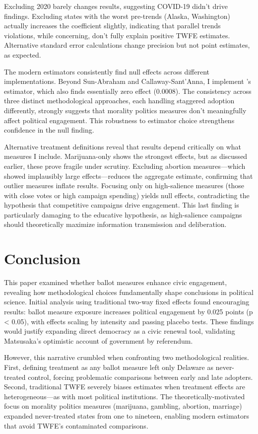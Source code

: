 \documentclass[12pt,letterpaper,oneside]{book}
\begin{document}
Excluding 2020 barely changes results, suggesting COVID-19 didn't drive findings. Excluding states with the worst pre-trends (Alaska, Washington) actually increases the coefficient slightly, indicating that parallel trends violations, while concerning, don't fully explain positive TWFE estimates. Alternative standard error calculations change precision but not point estimates, as expected.

The modern estimators consistently find null effects across different implementations. Beyond Sun-Abraham and Callaway-Sant'Anna, I implement \citet{de2020two}'s estimator, which also finds essentially zero effect (0.0008). The consistency across three distinct methodological approaches, each handling staggered adoption differently, strongly suggests that morality politics measures don't meaningfully affect political engagement. This robustness to estimator choice strengthens confidence in the null finding.

Alternative treatment definitions reveal that results depend critically on what measures I include. Marijuana-only shows the strongest effects, but as discussed earlier, these prove fragile under scrutiny. Excluding abortion measures---which showed implausibly large effects---reduces the aggregate estimate, confirming that outlier measures inflate results. Focusing only on high-salience measures (those with close votes or high campaign spending) yields null effects, contradicting the hypothesis that competitive campaigns drive engagement. This last finding is particularly damaging to the educative hypothesis, as high-salience campaigns should theoretically maximize information transmission and deliberation.

\section{Conclusion}

This paper examined whether ballot measures enhance civic engagement, revealing how methodological choices fundamentally shape conclusions in political science. Initial analysis using traditional two-way fixed effects found encouraging results: ballot measure exposure increases political engagement by 0.025 points (p < 0.05), with effects scaling by intensity and passing placebo tests. These findings would justify expanding direct democracy as a civic renewal tool, validating Matsusaka's optimistic account of government by referendum.

However, this narrative crumbled when confronting two methodological realities. First, defining treatment as any ballot measure left only Delaware as never-treated control, forcing problematic comparisons between early and late adopters. Second, traditional TWFE severely biases estimates when treatment effects are heterogeneous—as with most political institutions. The theoretically-motivated focus on morality politics measures (marijuana, gambling, abortion, marriage) expanded never-treated states from one to nineteen, enabling modern estimators that avoid TWFE's contaminated comparisons.
\end{document}
